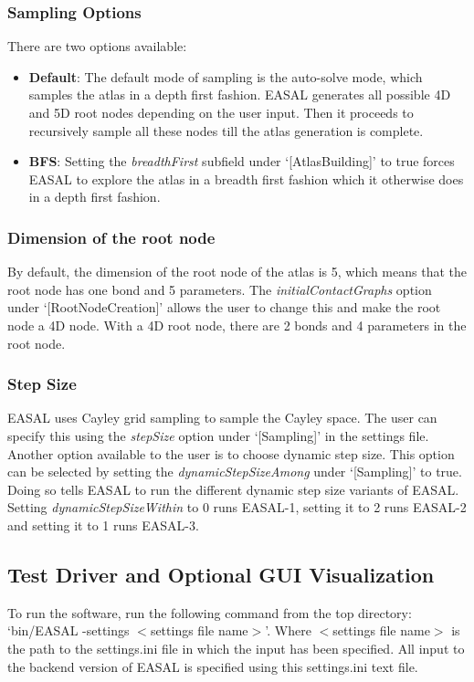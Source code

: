 \documentclass[10pt]{article}
\begin{document}
\subsubsection{Sampling Options} 
There are two options available:
\begin{itemize}
\item \textbf{Default}: The default mode of sampling is the auto-solve mode, which samples the atlas in a depth
first fashion. EASAL generates all possible 4D and 5D root nodes depending on the user input. Then
it proceeds to recursively sample all these nodes till the atlas generation is complete.

\item \textbf{BFS}: Setting the \emph{breadthFirst} subfield under `[AtlasBuilding]' to true forces EASAL to explore the
atlas in a breadth first fashion which it otherwise does in a depth first fashion.

\end{itemize}

\subsubsection{Dimension of the root node}
By default, the dimension of the root node of the atlas is 5, which means that the root node has one bond
and 5 parameters. The \emph{initialContactGraphs} option under `[RootNodeCreation]' allows the
user to change this and make the root node a 4D node. With a 4D root node, there are 2 bonds and 4
parameters in the root node.

\subsubsection{Step Size}
EASAL uses Cayley grid sampling to sample the Cayley space. The user can
specify this using the \emph{stepSize} option under `[Sampling]' in the
settings file. Another option available to the user is to choose dynamic step
size. This option can be selected by setting the \emph{dynamicStepSizeAmong}
under `[Sampling]' to true. Doing so tells EASAL to run the different dynamic
step size variants of EASAL. Setting \emph{dynamicStepSizeWithin} to 0 runs
EASAL-1, setting it to 2 runs EASAL-2 and setting it to 1 runs EASAL-3.

\subsection{Test Driver and Optional GUI Visualization}
\label{sec:part1test}
To run the software, run the following command from the top directory:
`bin/EASAL -settings $<$settings file name$>$'.  Where $<$settings file name$>$
is the path to the settings.ini file in which the input has been specified. All
input to the backend version of EASAL is specified using this settings.ini text
file.
\end{document}
